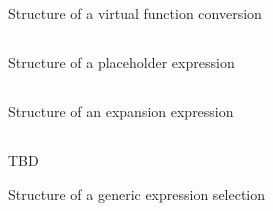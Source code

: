 \begin{figure}[H]
	\centering
	\caption{Structure of a virtual function conversion}
	\label{fig:ifc-virtual-function-conversion-structure}
\end{figure}



\subsection{}
\label{sec:ifc:ExprSort:Placeholder}

\begin{figure}[H]
	\centering
	\caption{Structure of a placeholder expression}
	\label{fig:ifc-placeholder-expr-structure}
\end{figure}


\subsection{}
\label{sec:ifc:ExprSort:Expansion}

\begin{figure}[H]
	\centering
	\caption{Structure of an expansion expression}
	\label{fig:ifc-expansion-expr-structure}
\end{figure}



\subsection{}
\label{sec:ifc:ExprSort:Generic}

\begin{figure}[H]
	\centering
	TBD
	\caption{Structure of a generic expression selection}
	\label{fig:ifc-generic-expr-structure}
\end{figure}


